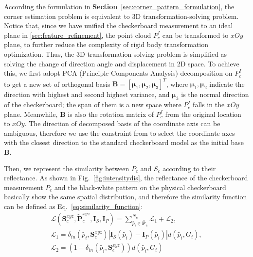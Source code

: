 \documentclass[journal]{vgtc}
\begin{document}
According the formulation in \textbf{Section}~\ref{sec:corner_pattern_formulation}, the corner estimation problem is equivalent to 3D transformation-solving problem. Notice that, since we have unified the checkerboard measurement to an ideal plane in \ref{sec:feature_refinement}, the point cloud $P^I_c$ can be transformed to $xOy$ plane, to further reduce the complexity of rigid body transformation optimization. Thus, the 3D transformation solving problem is simplified as solving the change of direction angle and displacement in 2D space. To achieve this, we first adopt PCA (Principle Components Analysis) decomposition on $P^I_c$ to get a new set of orthogonal basis $\bm B=[\bm \mu_1, \bm \mu_2, \bm \mu_3]^T$, where $\bm \mu_1, \bm \mu_2$ indicate the direction with highest and second highest variance, and $\bm \mu_3$ is the normal direction of the checkerboard; the span of them is a new space where $P^I_c$ falls in the $xOy$ plane. Meanwhile, $\bm B$ is also the rotation matrix of $P^I_c$ from the original location to $xOy$. The direction of decomposed basis of the coordinate axis can be ambiguous, therefore we use the constraint from \cite{wang2017reflectance} to select the coordinate axes with the closest direction to the standard checkerboard model as the initial base $\bm B$. 

Then, we represent the similarity between $P_c$ and $S_c$ according to their reflectance. As shown in Fig.~\ref{fig:intensitydis}, the reflectance of the checkerboard measurement $P_c$ and the black-white pattern on the physical checkerboard basically show the same spatial distribution, and therefore the similarity function can be defined as Eq.~\ref{eq:similarity_function}: 
\begin{equation}
	\label{eq:similarity_function}                  
	\begin{aligned}
		\mathcal{L}                                         
		(                                                   
		\bm S^{xyz}_c,                                      
		\tilde {\bm P}^{xyz}_c,                             
		\bm I_S,                                            
		\bm I_P                                             
		)                                                   
		=                                                   
		\sum                                                
		_{\tilde{p_i} \in \bm{\tilde{P_c}} }                
		^{N_c}                                              
		{\mathcal{L}_1 + \mathcal{L}_2},                    
		                                                    \\
		\mathcal{L}_1                                       
		=                                                   
		\delta_{in}( \tilde{p_i}, \bm S^{xyz}_c )           
		| \bm I_S( \tilde{p_i} ) - \bm I_P( \tilde{p_i} ) | 
		d( \tilde{p_i}, G_i ),                              
		                                                    \\
		\mathcal{L}_2                                       
		=                                                   
		( 1 - \delta_{in}( \tilde{p_i}, \bm S^{xyz}_c ) )   
		d( \tilde{p_i}, G_i )                               
	\end{aligned}
\end{equation}
\end{document}
